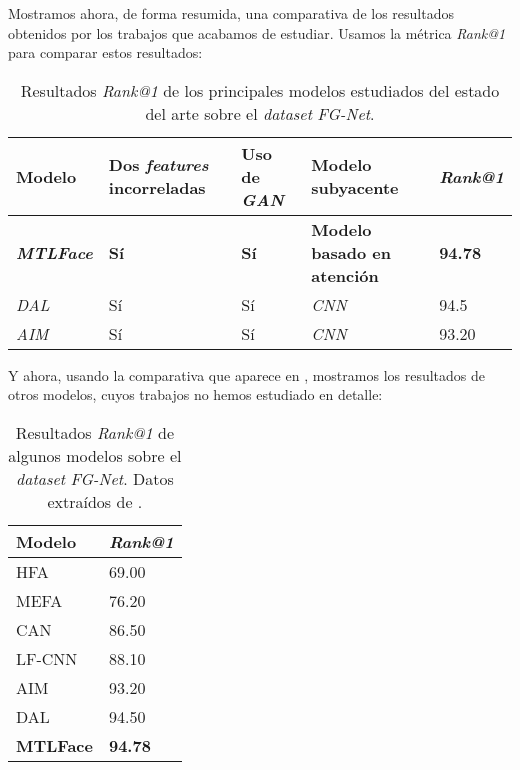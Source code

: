 Mostramos ahora, de forma resumida, una comparativa de los resultados obtenidos por los trabajos que acabamos de estudiar. Usamos la métrica \textit{Rank@1} \footnotemark para comparar estos resultados:

\begin{table}[H]
	\centering
	\begin{tabular}{|l|l|l|l|l|}
		\hline
		Modelo                    & Dos \textit{features} incorreladas & Uso de \textit{GAN} & Modelo subyacente                  & \textit{Rank@1} \\
		\hline

		\textbf{\textit{MTLFace}} & \textbf{Sí}                        & \textbf{Sí}         & \textbf{Modelo basado en atención} & \textbf{94.78}  \\
		\textit{DAL}              & Sí                                 & Sí                  & \textit{CNN}                       & 94.5            \\
		\textit{AIM}              & Sí                                 & Sí                  & \textit{CNN}                       & 93.20           \\
		\hline
	\end{tabular}
	\caption{Resultados \textit{Rank@1} de los principales modelos estudiados del estado del arte sobre el \textit{dataset} \textit{FG-Net}.}
\end{table}

Y ahora, usando la comparativa que aparece en \cite{informatica:best_fgnet_model}, mostramos los resultados de otros modelos, cuyos trabajos no hemos estudiado en detalle:

\begin{table}[H]
	\centering
	\begin{tabular}{|l|l|}
		\hline
		Modelo           & \textit{Rank@1} \\
		\hline
		HFA              & 69.00           \\
		MEFA             & 76.20           \\
		CAN              & 86.50           \\
		LF-CNN           & 88.10           \\
		AIM              & 93.20           \\
		DAL              & 94.50           \\
		\textbf{MTLFace} & \textbf{94.78}  \\
		\hline
	\end{tabular}
	\caption{Resultados \textit{Rank@1} de algunos modelos sobre el \textit{dataset} \textit{FG-Net}. Datos extraídos de \cite{informatica:best_fgnet_model}.}
\end{table}

